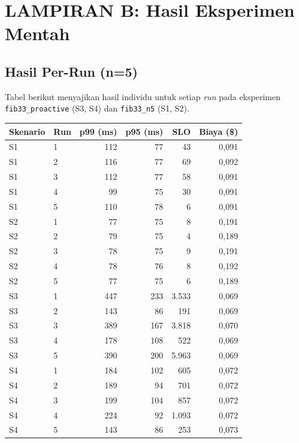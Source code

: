 
\chapter*{LAMPIRAN B: Hasil Eksperimen Mentah}

\section*{Hasil Per-Run (n=5)}

Tabel berikut menyajikan hasil individu untuk setiap \emph{run} pada eksperimen \texttt{fib33\_proactive} (S3, S4) dan \texttt{fib33\_n5} (S1, S2).

\begin{table}[htbp]
    \centering
    \tiny
    \begin{tabular}{llrrrr}
        \toprule
        Skenario & Run & p99 (ms) & p95 (ms) & SLO & Biaya (\$) \\
        \midrule
        S1 & 1 & 112 & 77 & 43 & 0,091 \\
        S1 & 2 & 116 & 77 & 69 & 0,092 \\
        S1 & 3 & 112 & 77 & 58 & 0,091 \\
        S1 & 4 & 99 & 75 & 30 & 0,091 \\
        S1 & 5 & 110 & 78 & 6 & 0,091 \\
        \midrule
        S2 & 1 & 77 & 75 & 8 & 0,191 \\
        S2 & 2 & 79 & 75 & 4 & 0,189 \\
        S2 & 3 & 78 & 75 & 9 & 0,191 \\
        S2 & 4 & 78 & 76 & 8 & 0,192 \\
        S2 & 5 & 77 & 75 & 6 & 0,189 \\
        \midrule
        S3 & 1 & 447 & 233 & 3.533 & 0,069 \\
        S3 & 2 & 143 & 86 & 191 & 0,069 \\
        S3 & 3 & 389 & 167 & 3.818 & 0,070 \\
        S3 & 4 & 178 & 108 & 522 & 0,069 \\
        S3 & 5 & 390 & 200 & 5.963 & 0,069 \\
        \midrule
        S4 & 1 & 184 & 102 & 605 & 0,072 \\
        S4 & 2 & 189 & 94 & 701 & 0,072 \\
        S4 & 3 & 199 & 104 & 857 & 0,072 \\
        S4 & 4 & 224 & 92 & 1.093 & 0,072 \\
        S4 & 5 & 143 & 86 & 253 & 0,073 \\
        \bottomrule
    \end{tabular}
\end{table}

